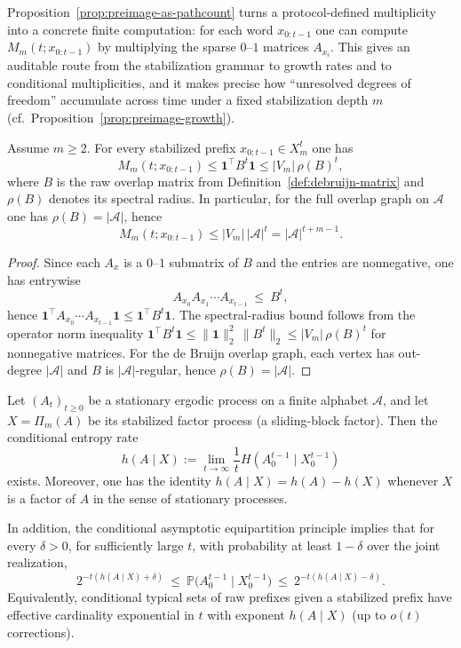 \begin{remark}\label{rem:pathcount-computable}
Proposition~\ref{prop:preimage-as-pathcount} turns a protocol-defined multiplicity into a concrete finite computation: for each word $x_{0:t-1}$ one can compute $M_m(t;x_{0:t-1})$ by multiplying the sparse $0$--$1$ matrices $A_{x_i}$. This gives an auditable route from the stabilization grammar to growth rates and to conditional multiplicities, and it makes precise how ``unresolved degrees of freedom'' accumulate across time under a fixed stabilization depth $m$ (cf.\ Proposition~\ref{prop:preimage-growth}).
\end{remark}

\begin{proposition}\label{prop:liftcount-upper-bound}
Assume $m\ge 2$. For every stabilized prefix $x_{0:t-1}\in X_m^t$ one has
\[
M_m(t;x_{0:t-1})\le \mathbf{1}^\top B^t \mathbf{1}\le |V_m|\,\rho(B)^t,
\]
where $B$ is the raw overlap matrix from Definition~\ref{def:debruijn-matrix} and $\rho(B)$ denotes its spectral radius.
In particular, for the full overlap graph on $\mathcal{A}$ one has $\rho(B)=|\mathcal{A}|$, hence
\[
M_m(t;x_{0:t-1})\le |V_m|\,|\mathcal{A}|^t=|\mathcal{A}|^{t+m-1}.
\]
\end{proposition}

\begin{proof}
Since each $A_x$ is a $0$--$1$ submatrix of $B$ and the entries are nonnegative, one has entrywise
\[
A_{x_0}A_{x_1}\cdots A_{x_{t-1}} \ \le\ B^t,
\]
hence $\mathbf{1}^\top A_{x_0}\cdots A_{x_{t-1}}\mathbf{1}\le \mathbf{1}^\top B^t\mathbf{1}$. The spectral-radius bound follows from the operator norm inequality $\mathbf{1}^\top B^t\mathbf{1}\le \|\mathbf{1}\|_2^2\,\|B^t\|_2 \le |V_m|\,\rho(B)^t$ for nonnegative matrices.
For the de Bruijn overlap graph, each vertex has out-degree $|\mathcal{A}|$ and $B$ is $|\mathcal{A}|$-regular, hence $\rho(B)=|\mathcal{A}|$.
\end{proof}

\begin{proposition}\label{prop:preimage-growth}
Let $(A_t)_{t\ge 0}$ be a stationary ergodic process on a finite alphabet $\mathcal{A}$, and let $X=\Pi_m(A)$ be its stabilized factor process (a sliding-block factor). Then the conditional entropy rate
\[
h(A\mid X):=\lim_{t\to\infty}\frac{1}{t}H(A_0^{t-1}\mid X_0^{t-1})
\]
exists. Moreover, one has the identity $h(A\mid X)=h(A)-h(X)$ whenever $X$ is a factor of $A$ in the sense of stationary processes.

In addition, the conditional asymptotic equipartition principle implies that for every $\delta>0$, for sufficiently large $t$, with probability at least $1-\delta$ over the joint realization,
\[
2^{-t(h(A\mid X)+\delta)}\ \le\ \mathbb{P}\bigl(A_0^{t-1}\mid X_0^{t-1}\bigr)\ \le\ 2^{-t(h(A\mid X)-\delta)}.
\]
Equivalently, conditional typical sets of raw prefixes given a stabilized prefix have effective cardinality exponential in $t$ with exponent $h(A\mid X)$ (up to $o(t)$ corrections).
\cite{CoverThomas2006}
\end{proposition}

